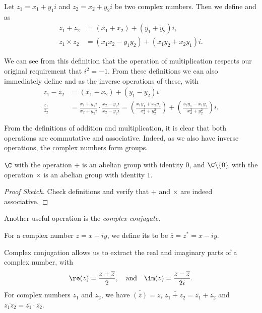 \documentclass[a4paper]{scrreprt}
\begin{document}
\begin{definition}
	Let $z_1 = x_1 + y_1 i$ and $z_2 = x_2 + y_2 i$ be two complex numbers. Then we define  and  as
	\begin{align*}
		z_1 + z_2 &= (x_1 + x_2) + (y_1 + y_2)i,\\
		z_1 \times z_2 &= (x_1 x_2 - y_1 y_2) + (x_1 y_2 + x_2 y_1)i.
	\end{align*}
\end{definition}

We can see from this definition that the operation of multiplication respects our original requirement that $i^2 = -1$. From these definitions we can also immediately define  and  as the inverse operations of these, with
\begin{align*}
	z_1 - z_2 &= (x_1 - x_2) + (y_1 - y_2)i \\
	\frac{z_1}{z_2} &= \frac{x_1 + y_1 i}{x_2 + y_2 i} \cdot \frac{x_2 - y_2i}{x_2 - y_2 i} = \left(\frac{x_1y_1 + x_2 y_2}{x_2^2 + y_2^2}\right) + \left(\frac{x_2y_1 - x_1 y_2}{x_2^2 + y_2^2}\right)i.
\end{align*}

From the definitions of addition and multiplication, it is clear that both operations are commutative and associative. Indeed, as we also have inverse operations, the complex numbers form groups.

\begin{proposition}[$\C$ is a Group]
	$\C$ with the operation $+$ is an abelian group with identity $0$, and $\C \backslash \{0\}$ with the operation $\times$ is an abelian group with identity $1$.
\end{proposition}
\begin{proof}[Proof Sketch]
	Check definitions and verify that $+$ and $\times$ are indeed associative.
\end{proof}

Another useful operation is the \emph{complex conjugate}. 

\begin{definition}
  For a complex number $z = x + iy$, we define its  to be $\overline{z} = z^* = x - iy$.
\end{definition}

Complex conjugation allows us to extract the real and imaginary parts of a complex number, with
$$
\re(z) = \frac{z+ \overline{z}}{2}, \quad \text{and} \quad \im(z) = \frac{z - \overline{z}}{2i}.
$$
For complex numbers $z_1$ and $z_2$, we have $\overline{(\overline{z})} = z$, $\overline{z_1 + z_2} = \overline{z_1} + \overline{z_2}$ and $\overline{z_1 z_2} = \overline{z_1} \cdot  \overline{z_2}$.
\end{document}

